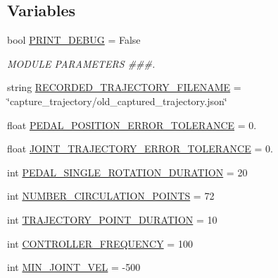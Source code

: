 \subsection*{Variables}
\begin{DoxyCompactItemize}
\item 
bool \mbox{\hyperlink{namespacejoint__angle__velocity__factor__test_a42e676018994307f693f6f3beda66a19}{P\+R\+I\+N\+T\+\_\+\+D\+E\+B\+UG}} = False
\begin{DoxyCompactList}\small\item\em M\+O\+D\+U\+LE P\+A\+R\+A\+M\+E\+T\+E\+RS \#\#\#. \end{DoxyCompactList}\item 
string \mbox{\hyperlink{namespacejoint__angle__velocity__factor__test_a90a00a9fee0b543ea3d15421301604cf}{R\+E\+C\+O\+R\+D\+E\+D\+\_\+\+T\+R\+A\+J\+E\+C\+T\+O\+R\+Y\+\_\+\+F\+I\+L\+E\+N\+A\+ME}} = \char`\"{}capture\+\_\+trajectory/old\+\_\+captured\+\_\+trajectory.\+json\char`\"{}
\item 
float \mbox{\hyperlink{namespacejoint__angle__velocity__factor__test_adca4cc497e814474aea582c44a70e4f5}{P\+E\+D\+A\+L\+\_\+\+P\+O\+S\+I\+T\+I\+O\+N\+\_\+\+E\+R\+R\+O\+R\+\_\+\+T\+O\+L\+E\+R\+A\+N\+CE}} = 0.
\item 
float \mbox{\hyperlink{namespacejoint__angle__velocity__factor__test_a99a0ae8a787881f1d2808298ccf4c978}{J\+O\+I\+N\+T\+\_\+\+T\+R\+A\+J\+E\+C\+T\+O\+R\+Y\+\_\+\+E\+R\+R\+O\+R\+\_\+\+T\+O\+L\+E\+R\+A\+N\+CE}} = 0.
\item 
int \mbox{\hyperlink{namespacejoint__angle__velocity__factor__test_a451c3f57e9771000dbb04c401391d21c}{P\+E\+D\+A\+L\+\_\+\+S\+I\+N\+G\+L\+E\+\_\+\+R\+O\+T\+A\+T\+I\+O\+N\+\_\+\+D\+U\+R\+A\+T\+I\+ON}} = 20
\item 
int \mbox{\hyperlink{namespacejoint__angle__velocity__factor__test_a65b84bebb82157d3676e1c4f44b2428c}{N\+U\+M\+B\+E\+R\+\_\+\+C\+I\+R\+C\+U\+L\+A\+T\+I\+O\+N\+\_\+\+P\+O\+I\+N\+TS}} = 72
\item 
int \mbox{\hyperlink{namespacejoint__angle__velocity__factor__test_a326990dac2249743c2e30d2098414f9e}{T\+R\+A\+J\+E\+C\+T\+O\+R\+Y\+\_\+\+P\+O\+I\+N\+T\+\_\+\+D\+U\+R\+A\+T\+I\+ON}} = 10
\item 
int \mbox{\hyperlink{namespacejoint__angle__velocity__factor__test_a9e0228db87deaba7941c62938cc177e4}{C\+O\+N\+T\+R\+O\+L\+L\+E\+R\+\_\+\+F\+R\+E\+Q\+U\+E\+N\+CY}} = 100
\item 
int \mbox{\hyperlink{namespacejoint__angle__velocity__factor__test_a7557bb9e2746298d1b8c92a2ad820ca8}{M\+I\+N\+\_\+\+J\+O\+I\+N\+T\+\_\+\+V\+EL}} = -\/500

\end{DoxyCompactItemize}
